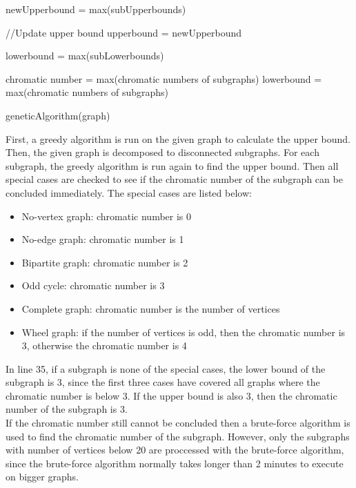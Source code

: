 \documentclass[a4paper]{report}
\begin{document}
		\begin{algorithm}                     
			\begin{algorithmic} [1]     

			\STATE newUpperbound = max(subUpperbounds)
			
			\STATE //Update upper bound
			\STATE upperbound = newUpperbound 
			\ENDIF
			
			\STATE lowerbound = max(subLowerbounds)
			
			\STATE chromatic number = max(chromatic numbers of subgraphs)
			\ELSE
			\STATE lowerbound = max(chromatic numbers of subgraphs)
			\ENDIF
			
			\STATE geneticAlgorithm(graph)
		\end{algorithmic}
	\end{algorithm}
	First, a greedy algorithm is run on the given graph to calculate the upper bound. Then, the given graph is decomposed to disconnected subgraphs. For each subgraph, the greedy algorithm is run again to find the upper bound. Then all special cases are checked to see if the chromatic number of the subgraph can be concluded immediately. The special cases are listed below: 
	\begin{itemize}
		\item No-vertex graph: chromatic number is 0
		\item No-edge graph: chromatic number is 1
		\item Bipartite graph: chromatic number is 2
		\item Odd cycle: chromatic number is 3
		\item Complete graph: chromatic number is the number of vertices
		\item Wheel graph: if the number of vertices is odd, then the chromatic number is 3, otherwise the chromatic number is 4
	\end{itemize}
	In line 35, if a subgraph is none of the special cases, the lower bound of the subgraph is 3, since the first three cases have covered all graphs where the chromatic number is below 3. If the upper bound is also 3, then the chromatic number of the subgraph is 3. \\
	If the chromatic number still cannot be concluded then a brute-force algorithm is used to find the chromatic number of the subgraph. However, only the subgraphs with number of vertices below 20 are proccessed with the brute-force algorithm, since the brute-force algorithm normally takes longer than 2 minutes to execute on bigger graphs. \\
\end{document}
